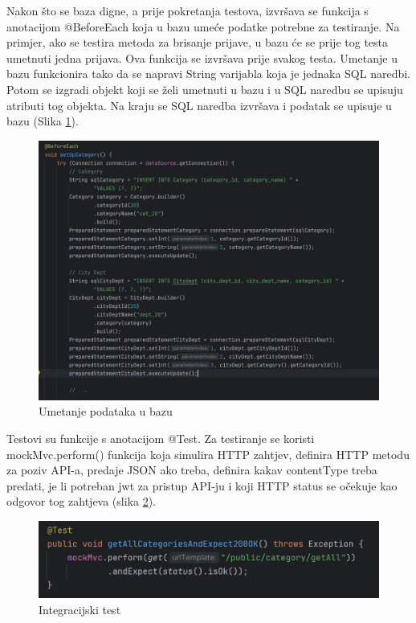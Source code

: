             Nakon što se baza digne, a prije pokretanja testova, izvršava se funkcija s anotacijom @BeforeEach koja u bazu umeće podatke potrebne za testiranje.
            Na primjer, ako se testira metoda za brisanje prijave, u bazu će se prije tog testa umetnuti jedna prijava.
			Ova funkcija se izvršava prije svakog testa.
            Umetanje u bazu funkcionira tako da se napravi String varijabla koja je jednaka SQL naredbi.
			Potom se izgradi objekt koji se želi umetnuti u bazu i u SQL naredbu se upisuju atributi tog objekta.
			Na kraju se SQL naredba izvršava i podatak se upisuje u bazu (Slika \ref{fig:beforeEach}).
            \begin{figure}[H]
                \includegraphics[scale=0.60]{slike/IT_beforeEach.png}
                \centering
                \caption{Umetanje podataka u bazu}
                \label{fig:beforeEach}
            \end{figure}

            Testovi su funkcije s anotacijom @Test.
			Za testiranje se koristi mockMvc.perform() funkcija koja simulira HTTP zahtjev, definira HTTP metodu za poziv API-a,
            predaje JSON ako treba, definira kakav contentType treba predati, je li potreban jwt za pristup API-ju i
			koji HTTP status se očekuje kao odgovor tog zahtjeva (slika \ref{fig:test}).
            \begin{figure}[H]
                \includegraphics[scale=0.60]{slike/IT_test.png}
                \centering
                \caption{Integracijski test}
                \label{fig:test}
            \end{figure}

